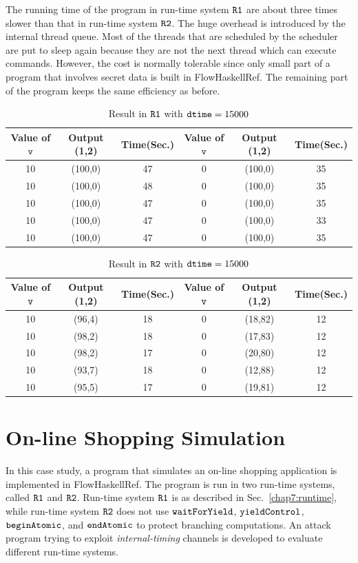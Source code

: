 \documentclass[a4paper]{report}
\newcommand{\co}[1]{$\cod{#1}$}
\begin{document}
The running time of the program in run-time system \co{R1} are about three times slower than that in
run-time system \co{R2}. The huge overhead is introduced by the internal thread queue. Most of the threads
that are scheduled by the scheduler are put to sleep again because they are not the next thread which 
can execute commands. However, the cost is normally tolerable since only small part of a program that involves
secret data is built in FlowHaskellRef. The remaining part of the program keeps the same efficiency as
before.


\begin{table}[t]
\centering
\begin{tabular}{|ccc||ccc|}
\hline
{\bf Value of} \co{v}& {\bf Output} (1,2)& {\bf Time}({\bf Sec.}) & 
{\bf Value of} \co{v}& {\bf Output} (1,2)& {\bf Time}({\bf Sec.})\\ \hline
10 & (100,0) & 47  & 0 & (100,0) & 35 \\
10 & (100,0) & 48  & 0 & (100,0) & 35 \\
10 & (100,0) & 47  & 0 & (100,0) & 35 \\
10 & (100,0) & 47  & 0 & (100,0) & 33 \\
10 & (100,0) & 47  & 0 & (100,0) & 35 \\
\hline
\end{tabular}
\caption{Result in \co{R1} with $\mathtt{dtime} = 15000$}
\label{table:r1:15000}
\end{table}

\begin{table}[t]
\centering
\begin{tabular}{|ccc||ccc|}
\hline
{\bf Value of} \co{v}& {\bf Output} (1,2)& {\bf Time}({\bf Sec.}) & 
{\bf Value of} \co{v}& {\bf Output} (1,2)& {\bf Time}({\bf Sec.})\\ \hline
10 & (96,4) & 18  & 0 & (18,82) & 12 \\
10 & (98,2) & 18  & 0 & (17,83) & 12 \\
10 & (98,2) & 17  & 0 & (20,80) & 12 \\
10 & (93,7) & 18  & 0 & (12,88) & 12 \\
10 & (95,5) & 17  & 0 & (19,81) & 12 \\
\hline
\end{tabular}
\caption{Result in \co{R2} with $\mathtt{dtime} = 15000$}
\label{table:r2:15000}
\end{table}

\section{On-line Shopping Simulation}
\label{chap8:shopping}
In this case study, a program that simulates an on-line shopping application is implemented in FlowHaskellRef.
The program is run in two run-time systems, called \co{R1} and \co{R2}. Run-time system \co{R1} is 
as described in Sec.~\ref{chap7:runtime}, while run-time system \co{R2} does not use \co{waitForYield}, \co{yieldControl},
\co{beginAtomic}, and \co{endAtomic} to protect branching computations. An attack program trying to exploit
{\em internal-timing} channels is developed to evaluate different run-time systems.
\end{document}
